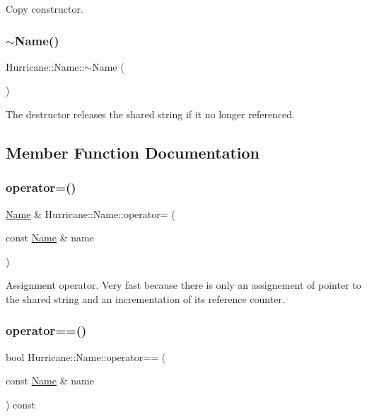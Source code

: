 Copy constructor. \mbox{\label{classHurricane_1_1Name_a1ce605ce16980334f93d7cc278984842}} 
\subsubsection{\texorpdfstring{$\sim$\+Name()}{~Name()}}
{\footnotesize\ttfamily Hurricane\+::\+Name\+::$\sim$\+Name (\begin{DoxyParamCaption}{ }\end{DoxyParamCaption})}

The destructor releases the shared string if it no longer referenced. 

\subsection{Member Function Documentation}
\mbox{\label{classHurricane_1_1Name_adcd165de286782c011acc31727adb4a1}} 
\subsubsection{\texorpdfstring{operator=()}{operator=()}}
{\footnotesize\ttfamily \mbox{\hyperlink{classHurricane_1_1Name}{Name}} \& Hurricane\+::\+Name\+::operator= (\begin{DoxyParamCaption}\item[{const \mbox{\hyperlink{classHurricane_1_1Name}{Name}} \&}]{name }\end{DoxyParamCaption})}

Assignment operator. Very fast because there is only an assignement of pointer to the shared string and an incrementation of its reference counter. \mbox{\label{classHurricane_1_1Name_a3b728f0b8aa027639ebd47c60addf738}} 
\subsubsection{\texorpdfstring{operator==()}{operator==()}}
{\footnotesize\ttfamily bool Hurricane\+::\+Name\+::operator== (\begin{DoxyParamCaption}\item[{const \mbox{\hyperlink{classHurricane_1_1Name}{Name}} \&}]{name }\end{DoxyParamCaption}) const}

